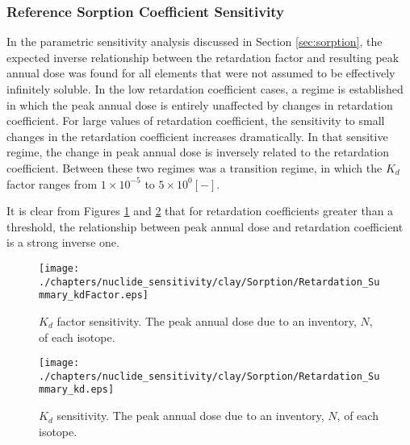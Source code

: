 
\subsubsection{Reference Sorption Coefficient Sensitivity}

In the parametric sensitivity analysis discussed in Section \ref{sec:sorption}, 
the expected inverse relationship between the retardation factor and resulting 
peak annual dose was found for all elements that were not assumed to be 
effectively infinitely soluble. In the low retardation coefficient cases, a 
regime is established in which the peak annual dose is entirely unaffected by 
changes in retardation coefficient. For large values of retardation 
coefficient, the sensitivity to small changes in the retardation coefficient 
increases dramatically. In that sensitive regime, the change in peak annual 
dose is inversely related to the retardation coefficient. Between these two 
regimes was a transition regime, in which the $K_d$ factor ranges from 
$1\times10^{-5}$ to $5\times10^{0} [-]$.

It is clear from Figures \ref{fig:KdSumFactor} and \ref{fig:KdSum} that 
for retardation coefficients greater than a threshold, the 
relationship between peak annual dose and retardation coefficient is a strong 
inverse one. 

\begin{figure}[ht]
\centering
\texttt{[image: ./chapters/nuclide\_sensitivity/clay/Sorption/Retardation\_Summary\_kdFactor.eps]}
\caption{$K_d$ factor sensitivity.  The peak annual dose due to an inventory, 
$N$, of each isotope.}
\label{fig:KdSumFactor}
\end{figure}

\begin{figure}[ht]
\centering
\texttt{[image: ./chapters/nuclide\_sensitivity/clay/Sorption/Retardation\_Summary\_kd.eps]}
\caption{$K_d$ sensitivity.  The peak annual dose due to an inventory, 
$N$, of each isotope.}
\label{fig:KdSum}
\end{figure}

\FloatBarrier
